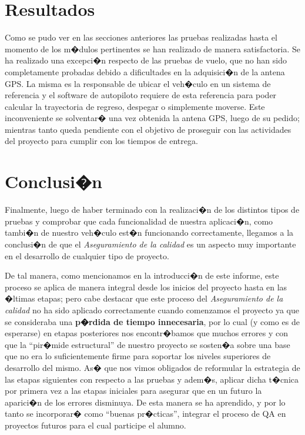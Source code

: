 \section{Resultados}
Como se pudo ver en las secciones anteriores las pruebas realizadas hasta el momento de los m�dulos pertinentes se han realizado de manera satisfactoria. Se ha realizado una excepci�n respecto de las pruebas de vuelo, que no han sido completamente probadas debido a dificultades en la adquisici�n de la antena GPS. La misma es la responsable de ubicar el veh�culo en un sistema de referencia y el software de autopiloto requiere de esta referencia para poder calcular la trayectoria de regreso, despegar o simplemente moverse. Este inconveniente se solventar� una vez obtenida la antena GPS, luego de su pedido; mientras tanto queda pendiente con el objetivo de proseguir con las actividades del proyecto para cumplir con los tiempos de entrega.
\newpage

\section{Conclusi�n}

Finalmente, luego de haber terminado con la realizaci�n de los distintos tipos de pruebas y comprobar que cada funcionalidad de nuestra aplicaci�n, como tambi�n de nuestro veh�culo est�n funcionando correctamente, llegamos a la conclusi�n de que el \textit{Aseguramiento de la calidad} es un aspecto muy importante en el desarrollo de cualquier tipo de proyecto. 

\par De tal manera, como mencionamos en la introducci�n de este informe,  este proceso se aplica de manera integral desde los inicios del proyecto hasta en las �ltimas etapas; pero cabe destacar que este proceso del \textit{Aseguramiento de la calidad} no ha sido aplicado correctamente cuando comenzamos el proyecto ya que se consideraba una \textbf{p�rdida de tiempo innecesaria}, por lo cual (y como es de esperarse) en etapas posteriores nos encontr�bamos que muchos errores y con que la ``pir�mide estructural'' de nuestro proyecto se sosten�a sobre una base que no era lo suficientemente firme para soportar los niveles superiores de desarrollo del mismo. As� que nos vimos obligados de reformular la estrategia de las etapas siguientes con respecto a las pruebas y adem�s, aplicar dicha t�cnica por primera vez a las etapas iniciales para asegurar que en un futuro la aparici�n de los errores disminuya. De esta manera se ha aprendido, y por lo tanto se incorporar� como ``buenas pr�cticas'', integrar el proceso de QA en proyectos futuros para el cual participe el alumno. 

















